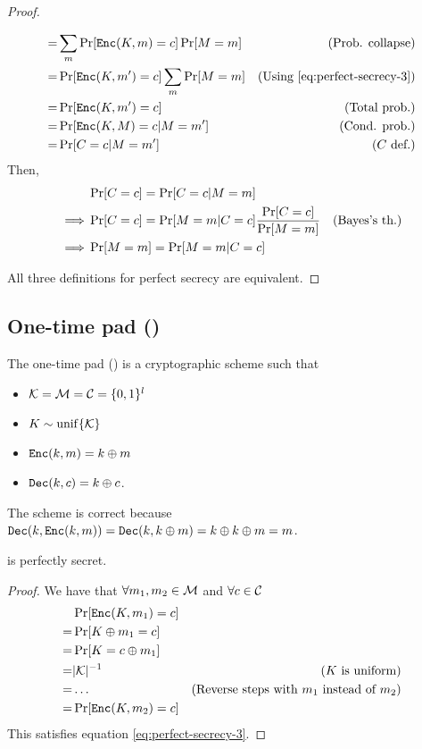\begin{proof}
\begin{itemize}
\begin{align*}
            =& \sum_{m}\Pr[\texttt{Enc}(K, m) = c]\Pr[M = m] & \text{(Prob. collapse)} \\
            =& \Pr[\texttt{Enc}(K, m') = c] \sum_{m}\Pr[M = m] & \text{(Using \ref{eq:perfect-secrecy-3})} \\
            =& \Pr[\texttt{Enc}(K, m') = c] & \text{(Total prob.)} \\
            =& \Pr[\texttt{Enc}(K, M) = c|M = m'] & \text{(Cond. prob.)} \\
            =& \Pr[C = c|M = m'] & \text{($C$ def.)}
        \end{align*}
%
        Then,
        \begin{align*}
            & \Pr[C = c] = \Pr[C = c|M = m] & \\
            \implies & \Pr[C = c] = \Pr[M = m|C = c]\frac{\Pr[C = c]}{\Pr[M = m]} & \text{(Bayes's th.)} \\
            \implies& \Pr[M = m] = \Pr[M = m|C = c] &
        \end{align*}
    \end{itemize}
%
    All three definitions for perfect secrecy are equivalent.
\end{proof}


\subsection{One-time pad (\otp)}
The one-time pad (\otp) is a cryptographic scheme such that
%
\begin{itemize}
	\item $\mathcal{K} = \mathcal{M} = \mathcal{C} = \{0, 1\}^l$
	\item $K \sim \operatorname{unif}\{\mathcal{K}\}$
    \item $\texttt{Enc}(k, m) = k \oplus m$
    \item $\texttt{Dec}(k, c) = k \oplus c$.
\end{itemize}
%
The scheme is correct because $\texttt{Dec}(k, \texttt{Enc}(k, m)) = \texttt{Dec}(k, k \oplus m) = k \oplus k \oplus m = m$.

\begin{theorem}\label{th:otp}
    \otp{} is perfectly secret.
\end{theorem}
\begin{proof}
    We have that $\forall m_1, m_2 \in \mathcal{M}$ and $\forall c \in \mathcal{C}$
    \begin{align*}
        & \Pr[\texttt{Enc}(K, m_1) = c] & \\
        =& \Pr[K \oplus m_1 = c] & \\
        =& \Pr[K = c \oplus m_1] & \\
        =& |\mathcal{K}|^{-1} & \text{($K$ is uniform)} \\
        =& \dots & \text{(Reverse steps with $m_1$ instead of $m_2$)} \\
        =& \Pr[\texttt{Enc}(K, m_2) = c] &  
    \end{align*}
    This satisfies equation \ref{eq:perfect-secrecy-3}.
\end{proof}

